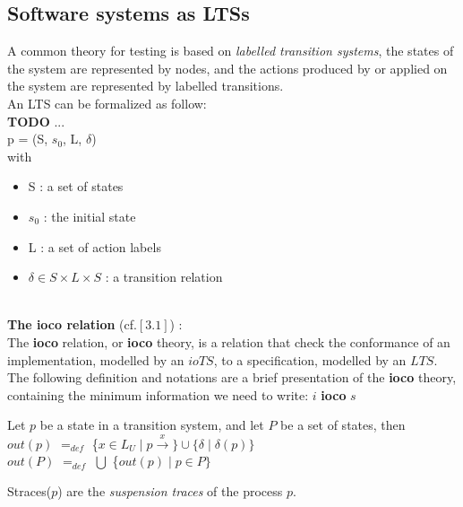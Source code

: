 \documentclass[a4paper]{report}
\begin{document}
\subsection*{Software systems as LTSs}
A common theory for testing is based on \textit{labelled transition systems}, the states of the system are represented by nodes, and the actions produced by or applied on the system are represented by labelled transitions.\\ An LTS can be formalized as follow:\\
{\color{red} \textbf{TODO}} ...\\
p = (S, $s_0$, L, $\delta$)\\
with 
\begin{itemize}
\item S : a set of states
\item $s_0$ : the initial state
\item L : a set of action labels
\item $\delta \in S \times L \times S$ : a transition relation
\end{itemize}
$ $\\
\newline
\textbf{The ioco relation} (cf.$[3.1]$) :\\
\newline
The \textbf{ioco} relation, or \textbf{ioco} theory, is a relation that check the conformance of an implementation, modelled by an $ioTS$, to a specification, modelled by an $LTS$. The following definition and notations are a brief presentation of the \textbf{ioco} theory, containing the minimum information we need to write: $i$ \textbf{ioco} $s$\\

\begin{definition}
Let $p$ be a state in a transition system, and let $P$ be a set of states, then\\
\newline
$out(p)$ $=_{def}$ \{$x\in L_U \mid p \xrightarrow{x} \} \cup \{ \delta \mid \delta (p) \}$\\
\newline
$out(P)$ $=_{def}$ $ \bigcup$ \{$out(p) \mid p \in P \}$\\
\end{definition}

\begin{definition}
Straces($p$) are the \textit{suspension traces} of the process $p$.\\
\end{definition}
\end{document}
